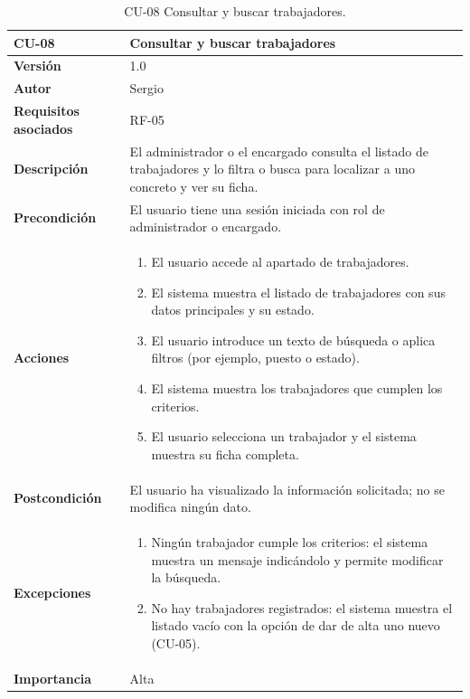 \begin{table}[p]
	\centering
	\begin{tabularx}{\linewidth}{ p{} p{} }
		\toprule
		\textbf{CU-08}    & \textbf{Consultar y buscar trabajadores}\\
		\toprule
		\textbf{Versión}              & 1.0    \\
		\textbf{Autor}                & Sergio \\
		\textbf{Requisitos asociados} & RF-05 \\
		\textbf{Descripción}          & El administrador o el encargado consulta el listado de trabajadores y lo filtra o busca para localizar a uno concreto y ver su ficha. \\
		\textbf{Precondición}         & El usuario tiene una sesión iniciada con rol de administrador o encargado. \\
		\textbf{Acciones}             &
		\begin{enumerate}
			\def\labelenumi{\arabic{enumi}.}
			\tightlist
			\item El usuario accede al apartado de trabajadores.
			\item El sistema muestra el listado de trabajadores con sus datos principales y su estado.
			\item El usuario introduce un texto de búsqueda o aplica filtros (por ejemplo, puesto o estado).
			\item El sistema muestra los trabajadores que cumplen los criterios.
			\item El usuario selecciona un trabajador y el sistema muestra su ficha completa.
		\end{enumerate}\\
		\textbf{Postcondición}        & El usuario ha visualizado la información solicitada; no se modifica ningún dato. \\
		\textbf{Excepciones}          &
		\begin{enumerate}
			\def\labelenumi{\arabic{enumi}.}
			\tightlist
			\item Ningún trabajador cumple los criterios: el sistema muestra un mensaje indicándolo y permite modificar la búsqueda.
			\item No hay trabajadores registrados: el sistema muestra el listado vacío con la opción de dar de alta uno nuevo (CU-05).
		\end{enumerate}\\
		\textbf{Importancia}          & Alta \\
		\bottomrule
	\end{tabularx}
	\caption{CU-08 Consultar y buscar trabajadores.}
\end{table}

